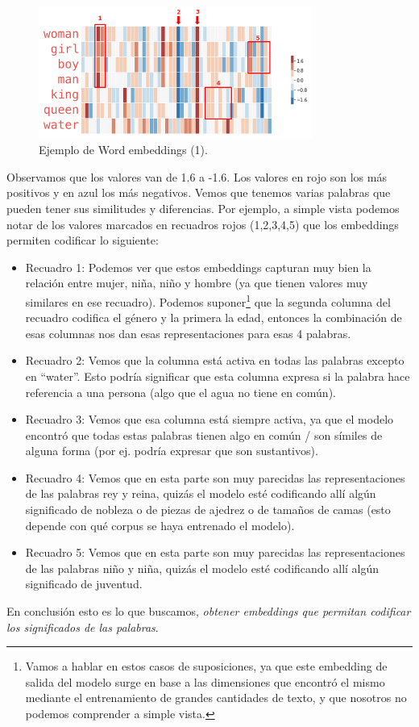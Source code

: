\documentclass[12pt,a4paper]{article}
\begin{document}
\begin{sloppypar}
\begin{figure}[H]    
 \centering
 \includegraphics[width=0.8\textwidth]{images/NLP/13.png}
 \caption{Ejemplo de Word embeddings (1)\cite{datitos_nlp}.}
 \label{fig:Imagen_NLP_13}
\end{figure}

Observamos que los valores van de 1.6 a -1.6. Los valores en rojo son los más positivos y en azul los más negativos. Vemos que tenemos varias palabras que pueden tener sus similitudes y diferencias. Por ejemplo, a simple vista podemos notar de los valores marcados en recuadros rojos (1,2,3,4,5) que los embeddings permiten codificar lo siguiente:
\begin{itemize}
\item Recuadro 1: Podemos ver que estos embeddings capturan muy bien la relación entre mujer, niña, niño y hombre (ya que tienen valores muy similares en ese recuadro). Podemos suponer\footnote{Vamos a hablar en estos casos de suposiciones, ya que este embedding de salida del modelo surge en base a las dimensiones que encontró el mismo mediante el entrenamiento de grandes cantidades de texto, y que nosotros no podemos comprender a simple vista.} que la segunda columna del recuadro codifica el género y la primera la edad, entonces la combinación de esas columnas nos dan esas representaciones para esas 4 palabras. 
\item Recuadro 2: Vemos que la columna está activa en todas las palabras excepto en “water”. Esto podría significar que esta columna expresa si la palabra hace referencia a una persona (algo que el agua no tiene en común).
\item Recuadro 3: Vemos que esa columna está siempre activa, ya que el modelo encontró que todas estas palabras tienen algo en común / son símiles de alguna forma (por ej. podría expresar que son sustantivos). 
\item Recuadro 4: Vemos que en esta parte son muy parecidas las representaciones de las palabras rey y reina, quizás el modelo esté codificando allí algún significado de nobleza o de piezas de ajedrez o de tamaños de camas (esto depende con qué corpus se haya entrenado el modelo). 
\item Recuadro 5: Vemos que en esta parte son muy parecidas las representaciones de las palabras niño y niña, quizás el modelo esté codificando allí algún significado de juventud. 
\end{itemize}
En conclusión esto es lo que buscamos, \textit{obtener embeddings que permitan codificar los significados de las palabras}.


\end{sloppypar}
\end{document}
